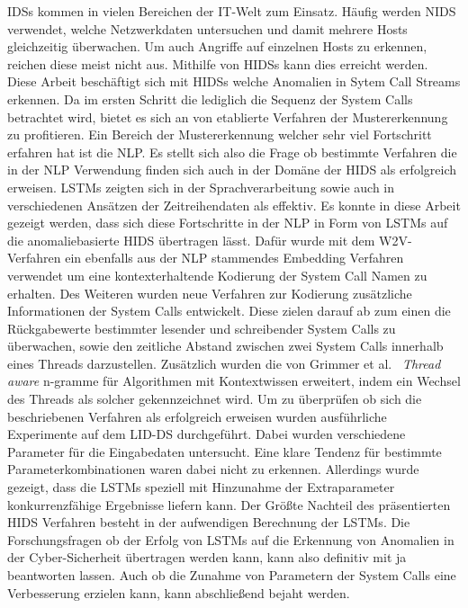 \acp{IDS} kommen in vielen Bereichen der IT-Welt zum Einsatz.
Häufig werden \ac{NIDS} verwendet, welche Netzwerkdaten untersuchen und damit mehrere Hosts gleichzeitig überwachen.
Um auch Angriffe auf einzelnen Hosts zu erkennen, reichen diese meist nicht aus.
Mithilfe von \acp{HIDS} kann dies erreicht werden.
Diese Arbeit beschäftigt sich mit \acp{HIDS} welche Anomalien in Sytem Call Streams erkennen. 
Da im ersten Schritt die lediglich die Sequenz der System Calls betrachtet wird, bietet es sich an von etablierte Verfahren der Mustererkennung zu profitieren.
Ein Bereich der Mustererkennung welcher sehr viel Fortschritt erfahren hat ist die \ac{NLP}.
Es stellt sich also die Frage ob bestimmte Verfahren die in der \ac{NLP} Verwendung finden sich auch in der Domäne der \ac{HIDS} als erfolgreich erweisen.
\acp{LSTM} zeigten sich in der Sprachverarbeitung sowie auch in verschiedenen Ansätzen der Zeitreihendaten als effektiv.
Es konnte in diese Arbeit gezeigt werden, dass sich diese Fortschritte in der \ac{NLP} in Form von \acp{LSTM} auf die anomaliebasierte \ac{HIDS} übertragen lässt.
Dafür wurde mit dem \ac{W2V}-Verfahren ein ebenfalls aus der \ac{NLP} stammendes Embedding Verfahren verwendet um eine kontexterhaltende Kodierung der System Call Namen zu erhalten.
Des Weiteren wurden neue Verfahren zur Kodierung zusätzliche Informationen der System Calls entwickelt.
Diese zielen darauf ab zum einen die Rückgabewerte bestimmter lesender und schreibender System Calls zu überwachen, sowie den zeitliche Abstand zwischen zwei System Calls innerhalb eines Threads darzustellen. 
Zusätzlich wurden die von Grimmer et al.~\cite{IDSTHREADGRIMMER2021} \textit{Thread aware} n-gramme für Algorithmen mit Kontextwissen erweitert, indem ein Wechsel des Threads als solcher gekennzeichnet wird.
Um zu überprüfen ob sich die beschriebenen Verfahren als erfolgreich erweisen wurden ausführliche Experimente auf dem \ac{LID-DS} durchgeführt.
Dabei wurden verschiedene Parameter für die Eingabedaten untersucht.
Eine klare Tendenz für bestimmte Parameterkombinationen waren dabei nicht zu erkennen.
Allerdings wurde gezeigt, dass die \acp{LSTM} speziell mit Hinzunahme der Extraparameter konkurrenzfähige Ergebnisse liefern kann.
Der Größte Nachteil des präsentierten \ac{HIDS} Verfahren besteht in der aufwendigen Berechnung der \acp{LSTM}.
Die Forschungsfragen ob der Erfolg von \acp{LSTM} auf die Erkennung von Anomalien in der Cyber-Sicherheit übertragen werden kann, kann also definitiv mit ja beantworten lassen.
Auch ob die Zunahme von Parametern der System Calls eine Verbesserung erzielen kann, kann abschließend bejaht werden.

